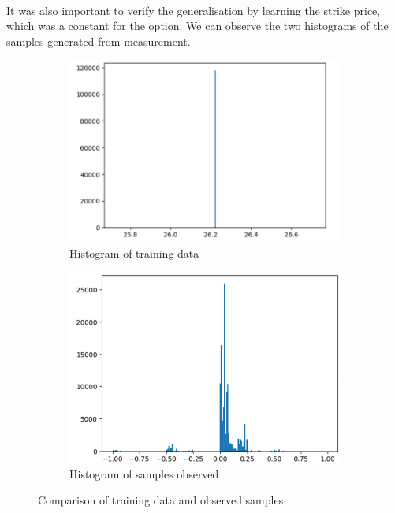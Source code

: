\documentclass[12pt]{article}
\numberwithin{equation}{section}
\begin{document}
\\
It was also important to verify the generalisation by learning the strike price,
which was a constant for the option. We can observe the two histograms of the 
samples generated from measurement.
\begin{figure}[h]
    \centering
    \begin{subfigure}[b]{0.45\textwidth}
        \centering
        \includegraphics[scale=0.6]{QCBM-strike1.png}
        \caption{Histogram of training data}
    \end{subfigure}
    \hfill
    \begin{subfigure}[b]{0.45\textwidth}
        \centering
        \includegraphics[scale=0.6]{QCBM-strike2.png}
        \caption{Histogram of samples observed}
    \end{subfigure}
    \caption{Comparison of training data and observed samples}
    \label{fig:comparison}
\end{figure}
\end{document}
